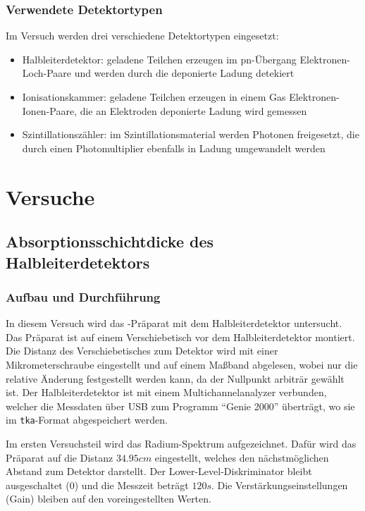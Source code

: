 \documentclass{../Misc/MontavonLaTeX/Montavon}
\begin{document}
\subsubsection{Verwendete Detektortypen}
Im Versuch werden drei verschiedene Detektortypen eingesetzt: 
\begin{itemize}
\item Halbleiterdetektor: geladene Teilchen erzeugen im pn-Übergang Elektronen-Loch-Paare und werden durch die deponierte Ladung detekiert 
\item Ionisationskammer: geladene Teilchen erzeugen in einem Gas Elektronen-Ionen-Paare, die an Elektroden deponierte Ladung wird gemessen 
\item Szintillationszähler: im Szintillationsmaterial werden Photonen freigesetzt, die durch einen Photomultiplier ebenfalls in Ladung umgewandelt werden
\end{itemize}

\section{Versuche}
\subsection{Absorptionsschichtdicke des Halbleiterdetektors}
\subsubsection{Aufbau und Durchführung}
In diesem Versuch wird das -Präparat mit dem Halbleiterdetektor untersucht. Das Präparat ist auf einem Verschiebetisch vor dem Halbleiterdetektor montiert. Die Distanz des Verschiebetisches zum Detektor wird mit einer Mikrometerschraube eingestellt und auf einem Maßband abgelesen, wobei nur die relative Änderung festgestellt werden kann, da der Nullpunkt arbiträr gewählt ist. Der Halbleiterdetektor ist mit einem Multichannelanalyzer verbunden, welcher die Messdaten über USB zum Programm \enquote{Genie 2000} überträgt, wo sie im \texttt{tka}-Format abgespeichert werden.

Im ersten Versuchsteil wird das Radium-Spektrum aufgezeichnet. Dafür wird das Präparat auf die Distanz $34.95 \unit{cm}$ eingestellt, welches den nächstmöglichen Abstand zum Detektor darstellt. 
Der Lower-Level-Diskriminator bleibt ausgeschaltet ($0$) und die Messzeit beträgt $120 \unit{s}$. Die Verstärkungseinstellungen (Gain) bleiben auf den voreingestellten Werten.
\end{document}

